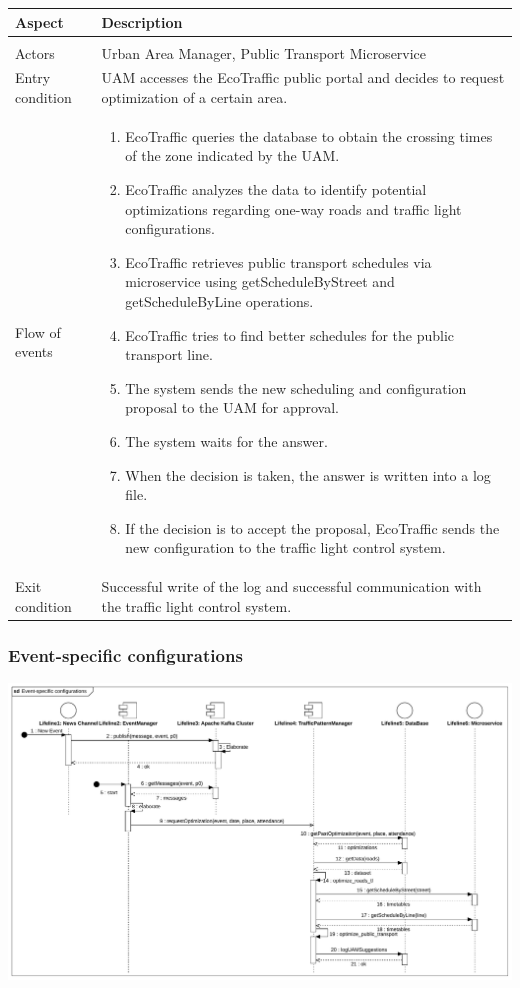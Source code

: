 \documentclass[12pt, a4paper, twoside, openright]{report}
\begin{document}
\begin{longtable}{>{\raggedright\arraybackslash}p{} >{\raggedright\arraybackslash}p{}}
\toprule
\textbf{Aspect} & \textbf{Description} \\
\midrule
\endhead
\midrule
\multicolumn{2}{r}{\textit{Continues on next page}} \\
\endfoot
\bottomrule
\endlastfoot

Actors & Urban Area Manager, Public Transport Microservice \\
Entry condition & UAM accesses the EcoTraffic public portal and decides to request optimization of a certain area. \\
Flow of events &
\begin{enumerate}
  \item EcoTraffic queries the database to obtain the crossing times of the zone indicated by the UAM.
  \item EcoTraffic analyzes the data to identify potential optimizations regarding one-way roads and traffic light configurations.
  \item EcoTraffic retrieves public transport schedules via microservice using getScheduleByStreet and getScheduleByLine operations.
  \item EcoTraffic tries to find better schedules for the public transport line.
  \item The system sends the new scheduling and configuration proposal to the UAM for approval.
  \item The system waits for the answer.
  \item When the decision is taken, the answer is written into a log file.
  \item If the decision is to accept the proposal, EcoTraffic sends the new configuration to the traffic light control system.
\end{enumerate}
\\
Exit condition & Successful write of the log and successful communication with the traffic light control system. \\
\end{longtable}

\subsubsection{Event-specific configurations}

\includegraphics[width=\linewidth]{images/svg/event-specific_configurations.pdf}
\end{document}
